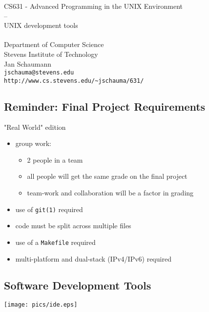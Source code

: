 \documentclass[xga]{xdvislides}
\begin{document}
\setfontphv

\lhead{\slidetitle}
\cfoot{\relax}
\rfoot{\Gray{\today}}

\vspace*{\fill}
\begin{center}
	\Hugesize
		CS631 - Advanced Programming in the UNIX Environment\\
		-- \\
		UNIX development tools \\
	\hspace*{5mm}\blueline\\ [1em]
	\Normalsize
		Department of Computer Science\\
		Stevens Institute of Technology\\
		Jan Schaumann\\
		\verb+jschauma@stevens.edu+\\
		\verb+http://www.cs.stevens.edu/~jschauma/631/+
\end{center}
\vspace*{\fill}

\subsection{Reminder: Final Project Requirements}
"Real World" edition
\begin{itemize}
	\item group work:
		\begin{itemize}
			\item 2 people in a team
			\item all people will get the same grade on the final project
			\item team-work and collaboration will be a factor in grading
		\end{itemize}
	\item use of {\tt git(1)} required
	\item code must be split across multiple files
	\item use of a {\tt Makefile} required
	\item multi-platform and dual-stack (IPv4/IPv6) required
\end{itemize}

\subsection{Software Development Tools}
\begin{center}
	\texttt{[image: pics/ide.eps]}
\end{center}
\end{document}
